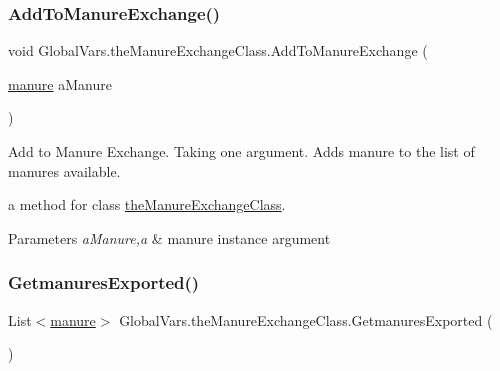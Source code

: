\subsubsection{\texorpdfstring{AddToManureExchange()}{AddToManureExchange()}}
{\footnotesize\ttfamily void Global\+Vars.\+the\+Manure\+Exchange\+Class.\+Add\+To\+Manure\+Exchange (\begin{DoxyParamCaption}\item[{\mbox{\hyperlink{classmanure}{manure}}}]{a\+Manure }\end{DoxyParamCaption})\hspace{0.3cm}{\ttfamily [inline]}}



Add to Manure Exchange. Taking one argument. Adds manure to the list of manures available. 

a method for class \mbox{\hyperlink{class_global_vars_1_1the_manure_exchange_class}{the\+Manure\+Exchange\+Class}}. 
\begin{DoxyParams}{Parameters}
{\em a\+Manure,a} & manure instance argument \\
\hline
\end{DoxyParams}
\mbox{\label{class_global_vars_1_1the_manure_exchange_class_a2525db95b29f8b0ed3ea31be425245ee}} 
\subsubsection{\texorpdfstring{GetmanuresExported()}{GetmanuresExported()}}
{\footnotesize\ttfamily List$<$\mbox{\hyperlink{classmanure}{manure}}$>$ Global\+Vars.\+the\+Manure\+Exchange\+Class.\+Getmanures\+Exported (\begin{DoxyParamCaption}{ }\end{DoxyParamCaption})\hspace{0.3cm}{\ttfamily [inline]}}

\mbox{\label{class_global_vars_1_1the_manure_exchange_class_aa35f94ee25e0788755da61d187f32c25}} 
